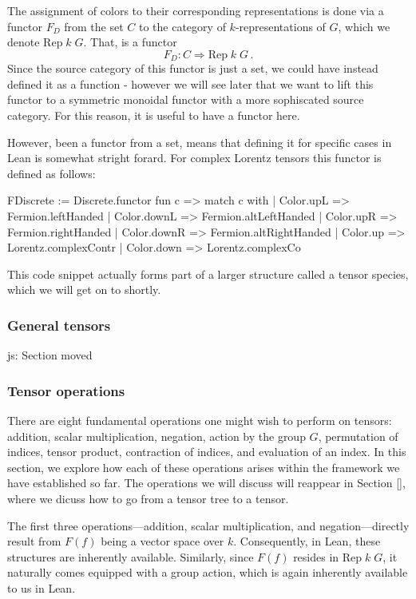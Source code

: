 \documentclass[a4paper, 11pt]{article}
\newcommand{\js}[1]{ {\color{magenta} js:  #1}}
\newcommand{\Rep}[2]{\mathrm{Rep} \; #1 \; #2}
\begin{document}
The assignment of colors to their corresponding representations is done via a functor $F_D$ 
from the set $C$ to the category of $k$-representations of $G$, which we denote $\Rep k G$.
That, is a functor
\begin{equation} 
  F_{D} : C \Rightarrow \Rep k G\, . 
\end{equation}
Since the source category of this functor is just a set, we could have instead defined it as 
a function - however we will see later that we want to lift this functor to a symmetric monoidal
functor with a more sophiscated source category. For this reason, it is useful to have a functor here. 

However, been a functor from a set, means that defining it for specific cases in Lean is somewhat stright forard. 
For complex Lorentz tensors this functor is defined as follows:
\begin{code}
FDiscrete := Discrete.functor fun c =>
  match c with
  | Color.upL => Fermion.leftHanded
  | Color.downL => Fermion.altLeftHanded
  | Color.upR => Fermion.rightHanded
  | Color.downR => Fermion.altRightHanded
  | Color.up => Lorentz.complexContr
  | Color.down => Lorentz.complexCo
\end{code}
This code snippet actually forms part of a larger structure called a tensor species, which we will
get on to shortly. 

\subsubsection{General tensors} \label{sec:generalTensors}
\js{Section moved}
\subsubsection{Tensor operations} \label{sec:tensorOperations}

There are eight fundamental operations one might wish to perform on tensors: addition, scalar multiplication, negation, action by the group 
$G$, permutation of indices, tensor product, contraction of indices, and evaluation of an index. 
In this section, we explore how each of these operations arises within the framework we have established so far.
The operations we will discuss will reappear in Section \ref{}, where we dicuss how to go from 
a tensor tree to a tensor.

The first three operations—addition, scalar multiplication, and negation—directly result from 
$F(f)$ being a vector space over $k$. Consequently, in Lean, these structures are inherently available.
Similarly, since $F(f)$ resides in $\Rep k G$, it naturally comes equipped with a group action,
which is again inherently available to us in Lean. 
\end{document}
